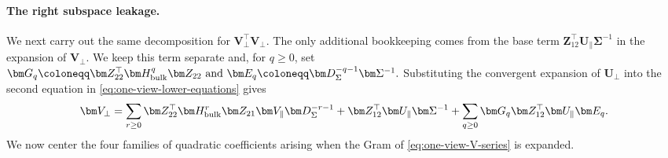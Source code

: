 \documentclass[11pt]{article}
\newcommand{\trans}{\top}
\begin{document}
\paragraph{The right subspace leakage.}
We next carry out the same decomposition for
$\bm V_\perp^\trans\bm V_\perp$.  The only additional bookkeeping comes from
the base term
$\bm Z_{12}^\trans\bm U_\parallel\bm\Sigma^{-1}$ in the expansion of
$\bm V_\perp$.  We keep this term separate and, for $q\ge0$, set
\(\bm G_q \coloneqq \bm Z_{22}^\trans\bm H_{\rm bulk}^q\bm Z_{22}$ and $\bm E_q \coloneqq \bm D_\Sigma^{-q-1}\bm\Sigma^{-1}.\)
Substituting the convergent expansion of $\bm U_\perp$ into the second
equation in \cref{eq:one-view-lower-equations} gives
\begin{equation}
\label{eq:one-view-V-series}
  \bm V_\perp
  =
  \sum_{r\ge0}
    \bm Z_{22}^\trans\bm H_{\rm bulk}^r
    \bm Z_{21}\bm V_\parallel
    \bm D_\Sigma^{-r-1}
  +
  \bm Z_{12}^\trans\bm U_\parallel\bm\Sigma^{-1}
  +
  \sum_{q \geq 0}
    \bm G_q\bm Z_{12}^\trans
    \bm U_\parallel\bm E_q.
\end{equation}
We now center the four families of quadratic coefficients arising when the Gram of
\cref{eq:one-view-V-series} is expanded.
\end{document}
